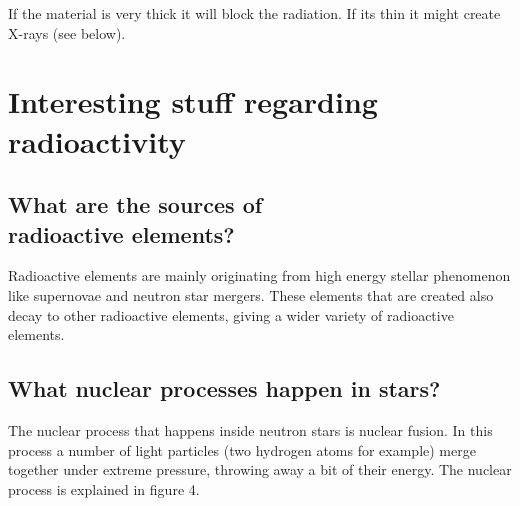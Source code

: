 \documentclass[]{article}
\begin{document}
If the material is very thick it will block the radiation. If its thin it might create X-rays (see below).

\section{Interesting stuff regarding \\ radioactivity}
\subsection{What are the sources of \\ radioactive elements?}

Radioactive elements are mainly originating from high energy stellar phenomenon like supernovae and neutron star mergers. These elements that are created also decay to other radioactive elements, giving a wider variety of radioactive elements.

\subsection{What nuclear processes happen in stars?}

The nuclear process that happens inside neutron stars is nuclear fusion. In this process a number of light particles (two hydrogen atoms for example) merge together under extreme pressure, throwing away a bit of their energy. The nuclear process is explained in figure 4.
\end{document}

